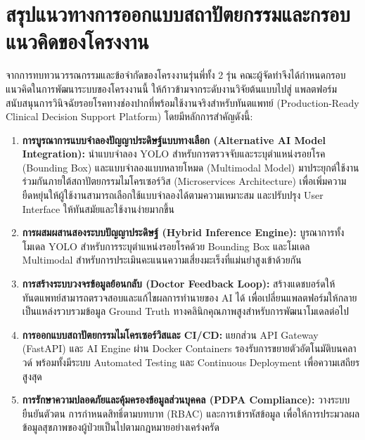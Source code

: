 \section{สรุปแนวทางการออกแบบสถาปัตยกรรมและกรอบแนวคิดของโครงงาน}
\label{sec:system_framework_summary}

จากการทบทวนวรรณกรรมและข้อจำกัดของโครงงานรุ่นพี่ทั้ง 2 รุ่น คณะผู้จัดทำจึงได้กำหนดกรอบแนวคิดในการพัฒนาระบบของโครงงานนี้ ให้ก้าวข้ามจากระดับงานวิจัยต้นแบบไปสู่ แพลตฟอร์มสนับสนุนการวินิจฉัยรอยโรคทางช่องปากที่พร้อมใช้งานจริงสำหรับทันตแพทย์ (Production-Ready Clinical Decision Support Platform) โดยมีหลักการสำคัญดังนี้:

\begin{enumerate}
    \item \textbf{การบูรณาการแบบจำลองปัญญาประดิษฐ์แบบทางเลือก (Alternative AI Model Integration):} นำแบบจำลอง YOLO สำหรับการตรวจจับและระบุตำแหน่งรอยโรค (Bounding Box) และแบบจำลองแบบหลายโหมด (Multimodal Model) มาประยุกต์ใช้งานร่วมกันภายใต้สถาปัตยกรรมไมโครเซอร์วิส (Microservices Architecture) เพื่อเพิ่มความยืดหยุ่นให้ผู้ใช้งานสามารถเลือกใช้แบบจำลองได้ตามความเหมาะสม และปรับปรุง User Interface ให้ทันสมัยและใช้งานง่ายมากขึ้น
    \item \textbf{การผสมผสานสองระบบปัญญาประดิษฐ์ (Hybrid Inference Engine):} บูรณาการทั้งโมเดล YOLO สำหรับการระบุตำแหน่งรอยโรคด้วย Bounding Box และโมเดล Multimodal สำหรับการประเมินคะแนนความเสี่ยงมะเร็งที่แม่นยำสูงเข้าด้วยกัน
    
    \item \textbf{การสร้างระบบวงจรข้อมูลย้อนกลับ (Doctor Feedback Loop):} สร้างแดชบอร์ดให้ทันตแพทย์สามารถตรวจสอบและแก้ไขผลการทำนายของ AI ได้ เพื่อเปลี่ยนแพลตฟอร์มให้กลายเป็นแหล่งรวบรวมข้อมูล Ground Truth ทางคลินิกคุณภาพสูงสำหรับการพัฒนาโมเดลต่อไป
    \item \textbf{การออกแบบสถาปัตยกรรมไมโครเซอร์วิสและ CI/CD:} แยกส่วน API Gateway (FastAPI) และ AI Engine ผ่าน Docker Containers รองรับการขยายตัวอัตโนมัติบนคลาวด์ พร้อมทั้งมีระบบ Automated Testing และ Continuous Deployment เพื่อความเสถียรสูงสุด
    \item \textbf{การรักษาความปลอดภัยและคุ้มครองข้อมูลส่วนบุคคล (PDPA Compliance):} วางระบบยืนยันตัวตน การกำหนดสิทธิ์ตามบทบาท (RBAC) และการเข้ารหัสข้อมูล เพื่อให้การประมวลผลข้อมูลสุขภาพของผู้ป่วยเป็นไปตามกฎหมายอย่างเคร่งครัด
\end{enumerate}


